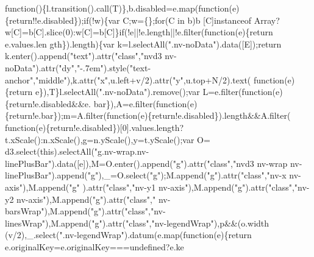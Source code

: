 \begin{DoxyCode}
{{      function}()\{l.transition().call(T)\},b.disabled=e.map(\textcolor{keyword}{function}(e)\{\textcolor{keywordflow}{return}!!e.disabled\});\textcolor{keywordflow}{if}(!w)\{var C;w=\{\};\textcolor{keywordflow}{for}(C in b)b
      [C]instanceof Array?w[C]=b[C].slice(0):w[C]=b[C]\}\textcolor{keywordflow}{if}(!e||!e.length||!e.filter(\textcolor{keyword}{function}(e)\{return e.values.len
      gth\}).length)\{var k=l.selectAll(\textcolor{stringliteral}{".nv-noData"}).data([E]);\textcolor{keywordflow}{return} k.enter().append(\textcolor{stringliteral}{"text"}).attr(\textcolor{stringliteral}{"class"},\textcolor{stringliteral}{"nvd3
       nv-noData"}).attr(\textcolor{stringliteral}{"dy"},\textcolor{stringliteral}{"-.7em"}).style(\textcolor{stringliteral}{"text-anchor"},\textcolor{stringliteral}{"middle"}),k.attr(\textcolor{stringliteral}{"x"},u.left+v/2).attr(\textcolor{stringliteral}{"y"},u.top+N/2).text(\textcolor{keyword}{
      function}(e)\{\textcolor{keywordflow}{return} e\}),T\}l.selectAll(\textcolor{stringliteral}{".nv-noData"}).remove();var L=e.filter(\textcolor{keyword}{function}(e)\{\textcolor{keywordflow}{return}!e.disabled&&e.
      bar\}),A=e.filter(\textcolor{keyword}{function}(e)\{return!e.bar\});m=A.filter(\textcolor{keyword}{function}(e)\{\textcolor{keywordflow}{return}!e.disabled\}).length&&A.filter(\textcolor{keyword}{
      function}(e)\{return!e.disabled\})[0].values.length?t.xScale():n.xScale(),g=n.yScale(),y=t.yScale();var O=
      d3.select(\textcolor{keyword}{this}).selectAll(\textcolor{stringliteral}{"g.nv-wrap.nv-linePlusBar"}).data([e]),M=O.enter().append(\textcolor{stringliteral}{"g"}).attr(\textcolor{stringliteral}{"class"},\textcolor{stringliteral}{"nvd3
       nv-wrap nv-linePlusBar"}).append(\textcolor{stringliteral}{"g"}),\_=O.select(\textcolor{stringliteral}{"g"});M.append(\textcolor{stringliteral}{"g"}).attr(\textcolor{stringliteral}{"class"},\textcolor{stringliteral}{"nv-x nv-axis"}),M.append(\textcolor{stringliteral}{"g"}
      ).attr(\textcolor{stringliteral}{"class"},\textcolor{stringliteral}{"nv-y1 nv-axis"}),M.append(\textcolor{stringliteral}{"g"}).attr(\textcolor{stringliteral}{"class"},\textcolor{stringliteral}{"nv-y2 nv-axis"}),M.append(\textcolor{stringliteral}{"g"}).attr(\textcolor{stringliteral}{"class"},\textcolor{stringliteral}{"
      nv-barsWrap"}),M.append(\textcolor{stringliteral}{"g"}).attr(\textcolor{stringliteral}{"class"},\textcolor{stringliteral}{"nv-linesWrap"}),M.append(\textcolor{stringliteral}{"g"}).attr(\textcolor{stringliteral}{"class"},\textcolor{stringliteral}{"nv-legendWrap"}),p&&(o.width
      (v/2),\_.select(\textcolor{stringliteral}{".nv-legendWrap"}).datum(e.map(\textcolor{keyword}{function}(e)\{return e.originalKey=e.originalKey===undefined?e.ke
}
\end{DoxyCode}
